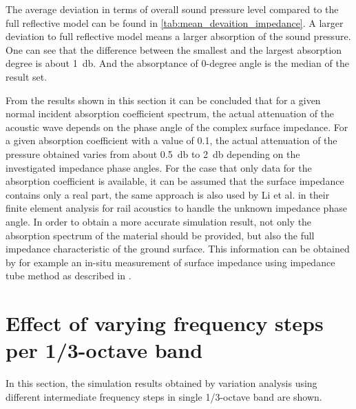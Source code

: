 The average deviation in terms of overall sound pressure level compared to the full reflective model can be found in \cref{tab:mean_devaition_impedance}. A larger deviation to full reflective model means a larger absorption of the sound pressure. One can see that the difference between the smallest and the largest absorption degree is about \SI{1}{\decibel}. And the absorptance of 0-degree angle is the median of the result set.

From the results shown in this section it can be concluded that for a given normal incident absorption coefficient spectrum, the actual attenuation of the acoustic wave depends on the phase angle of the complex surface impedance. For a given absorption coefficient with a value of 0.1, the actual attenuation of the pressure obtained varies from about \SI{0.5}{\decibel} to \SI{2}{\decibel} depending on the investigated impedance phase angles. For the case that only data for the absorption coefficient is available, it can be assumed that the surface impedance contains only a real part, the same approach is also used by Li et al. \cite{li_25d_2021} in their finite element analysis for rail acoustics to handle the unknown impedance phase angle. In order to obtain a more accurate simulation result, not only the absorption spectrum of the material should be provided, but also the full impedance characteristic of the ground surface. This information can be obtained by for example an in-situ measurement of surface impedance using impedance tube method as described in \cite{hald_situ_2019, wolkesson_2013}.

\section{Effect of varying frequency steps per 1/3-octave band}

In this section, the simulation results obtained by variation analysis using different intermediate frequency steps in single 1/3-octave band are shown.

